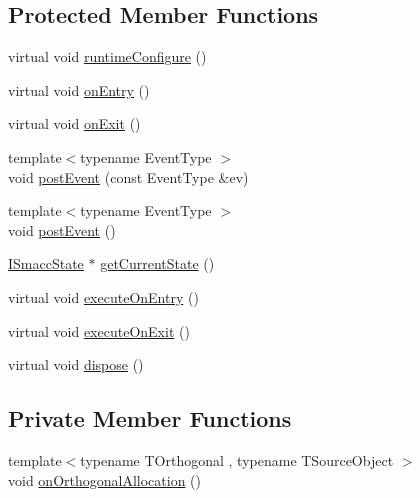 \subsection*{Protected Member Functions}
\begin{DoxyCompactItemize}
\item 
virtual void \hyperlink{classsmacc_1_1ISmaccClientBehavior_a1078de57f291301cc2829c3548fa5ea5}{runtime\+Configure} ()
\item 
virtual void \hyperlink{classsmacc_1_1ISmaccClientBehavior_a3ec24a839087c550e1d62a81e48cf530}{on\+Entry} ()
\item 
virtual void \hyperlink{classsmacc_1_1ISmaccClientBehavior_a36bf771905e3bf750909a15e4215a9b3}{on\+Exit} ()
\item 
{\footnotesize template$<$typename Event\+Type $>$ }\\void \hyperlink{classsmacc_1_1ISmaccClientBehavior_af8c7fc75e85d717ecee0dcd254f71681}{post\+Event} (const Event\+Type \&ev)
\item 
{\footnotesize template$<$typename Event\+Type $>$ }\\void \hyperlink{classsmacc_1_1ISmaccClientBehavior_a5db577c585935114058770f2b7242f8a}{post\+Event} ()
\item 
\hyperlink{classsmacc_1_1ISmaccState}{I\+Smacc\+State} $\ast$ \hyperlink{classsmacc_1_1ISmaccClientBehavior_a34fde34e48fa13db622ee60d8374d0b8}{get\+Current\+State} ()
\item 
virtual void \hyperlink{classsmacc_1_1ISmaccClientBehavior_a90b7032f7520f9e7e805835e6ed9d43e}{execute\+On\+Entry} ()
\item 
virtual void \hyperlink{classsmacc_1_1ISmaccClientBehavior_ac88fbad78c928b4bca6d18659ddfd8c0}{execute\+On\+Exit} ()
\item 
virtual void \hyperlink{classsmacc_1_1ISmaccClientBehavior_abdc74a8d95fdd02794c19dfa90f8a6ce}{dispose} ()
\end{DoxyCompactItemize}
\subsection*{Private Member Functions}
\begin{DoxyCompactItemize}
\item 
{\footnotesize template$<$typename T\+Orthogonal , typename T\+Source\+Object $>$ }\\void \hyperlink{classsmacc_1_1ISmaccClientBehavior_a6765b53cec4eb8c663cc8c2d63649ae4}{on\+Orthogonal\+Allocation} ()
\end{DoxyCompactItemize}
